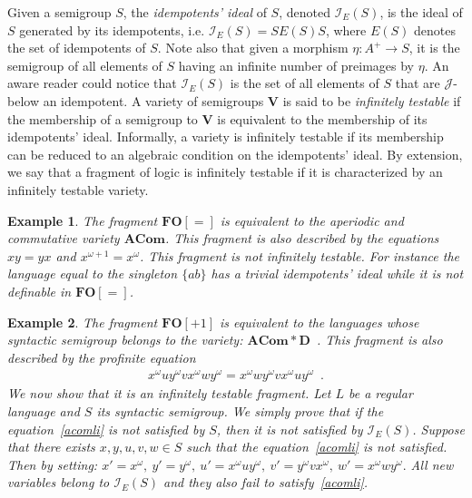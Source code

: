 \documentclass[submission,hidelink]{dmtcs-episciences}
\newtheorem{example}{Example}
\newcommand{\D}{\mathbf{D}}
\newcommand{\V}{\mathbf{V}}
\newcommand{\FO}{\mathbf{FO}}
\newcommand{\tinf}[1]{\mathcal{I}_E(#1)}
\newcommand{\ACOM}{\mathbf{ACom}}
\begin{document}
	Given a semigroup $S$, the \emph{idempotents' ideal} of $S$, denoted $\tinf S$,
	is the ideal of $S$ generated by its idempotents, i.e. $\tinf S=SE(S)S$, where $E(S)$ denotes the set of idempotents of $S$.
	Note also that given a morphism
	 $\eta:A^+\to S$, it is the semigroup
	of all elements of $S$ having an infinite number of preimages by $\eta$.
	An aware reader could notice that $\tinf S$ is the set of all elements of $S$ that
	are $\mathcal J$-below an idempotent.
	A variety of semigroups $\V$ is said to be \emph{infinitely testable}
	if the membership of a semigroup to $\V$ is equivalent to
	the membership of its idempotents' ideal.
	Informally, a variety is infinitely testable if its membership
	can be reduced to an algebraic condition on the idempotents' ideal.
	By extension, we say that a fragment of logic is infinitely testable if
	it is characterized by an infinitely testable variety.
	\begin{example}
	The fragment $\FO[=]$ is equivalent to the
	aperiodic and commutative variety $\ACOM$. This fragment is also described by the equations
	$xy=yx$ and $x^{\omega+1} = x^\omega$. This fragment is not infinitely
	testable. For instance the language equal to the singleton $\{ab\}$ has a trivial idempotents' ideal while it is
	not
	definable in $\FO[=]$.
	\end{example}


\begin{example}\label{Prop:FO1-InfTest}
	The fragment $\FO[+1]$ is equivalent to the languages whose syntactic semigroup belongs to
	the variety: $\ACOM*\D$~\citep[Theorem VI.3.1]{Straubing94}.
	This fragment is also described by the profinite equation
	\begin{align*}
	x^\omega u y^\omega v x^\omega w y^\omega =x^\omega w y^\omega v x^\omega u y^\omega\enspace.  \tag{a}\label{acomli}
	\end{align*}
	We now show that it is an infinitely testable fragment.
	Let $L$ be a regular language and $S$ its syntactic semigroup.
	We simply prove that if the equation~\eqref{acomli} is not satisfied by $S$, then it is not satisfied by
	$\tinf{S}$.
	Suppose that there exists $x,y,u,v,w\in S$ such that the  equation~\eqref{acomli} is not satisfied.
	Then by setting:
		$x' = x^\omega,\ 	y' = y^\omega,\
		u' = x^\omega u y^\omega, \  v' = y^\omega v x^\omega, \   w' = x^\omega w y^\omega.$
	All new variables belong to $\tinf S$ and they also fail to satisfy~\eqref{acomli}.
\end{example}
\end{document}
